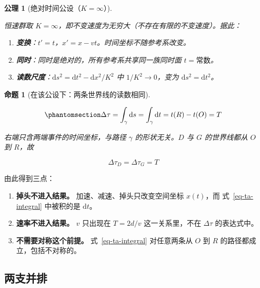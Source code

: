 \documentclass[
  chinese,
  a4paper,
  UTF8,
  12pt,
  oneside,
  openany]{ctexbook}
\providecommand{\tightlist}{%
  \setlength{\itemsep}{0pt}\setlength{\parskip}{0pt}}
\theoremstyle{plain}
\theoremstyle{plain}
\newtheorem{conjecture}{公理}[chapter]
\theoremstyle{plain}
\newtheorem{proposition}{命题}[chapter]
\theoremstyle{definition}
\theoremstyle{plain}
\theoremstyle{plain}
\theoremstyle{remark}
\begin{document}
\begin{conjecture}[绝对时间公设（\(K=\infty\)）]\protect\hypertarget{cnj-ta-absolute-time}{}\label{cnj-ta-absolute-time}

恒速群取
\(K=\infty\)，即不变速度为无穷大（不存在有限的不变速度）。据此：

\begin{enumerate}
\def\labelenumi{\arabic{enumi}.}
\tightlist
\item
  \textbf{变换}：\(t'=t\)，\(x'=x-vt\)。时间坐标不随参考系改变。
\item
  \textbf{同时}：同时是绝对的，所有参考系共享同一族同时面
  \(t=\text{常数}\)。
\item
  \textbf{读数尺度}：\(\mathrm{d}s^{2}=\mathrm{d}t^{2}-\mathrm{d}x^{2}/K^{2}\)
  中 \(1/K^{2}\to0\)，变为 \(\mathrm{d}s^{2}=\mathrm{d}t^{2}\)。
\end{enumerate}

\end{conjecture}

\begin{proposition}[在该公设下：两条世界线的读数相同]\protect\hypertarget{prp-ta-equal}{}\label{prp-ta-equal}

\begin{equation}\protect\phantomsection\label{eq-ta-integral}{
\Delta\tau=\int_{\gamma}\mathrm{d}s=\int_{\gamma}\mathrm{d}t=t(R)-t(O)=T
}\end{equation}

右端只含两端事件的时间坐标，与路径 \(\gamma\) 的形状无关。\(D\) 与 \(G\)
的世界线都从 \(O\) 到 \(R\)，故

\[
\Delta\tau_D=\Delta\tau_G=T
\]

\end{proposition}

由此得到三点：

\begin{enumerate}
\def\labelenumi{\arabic{enumi}.}
\tightlist
\item
  \textbf{掉头不进入结果。} 加速、减速、掉头只改变空间坐标 \(x(t)\)，而
  式~\ref{eq-ta-integral} 中被积的是 \(\mathrm{d}t\)。
\item
  \textbf{速率不进入结果。} \(v\) 只出现在 \(T=2d/v\) 这一关系里，不在
  \(\Delta\tau\) 的表达式中。
\item
  \textbf{不需要对称这个前提。} 式~\ref{eq-ta-integral} 对任意两条从
  \(O\) 到 \(R\) 的路径都成立，包括不对称的。
\end{enumerate}

\subsection{两支并排}\label{sec-ta-compare}
\end{document}
